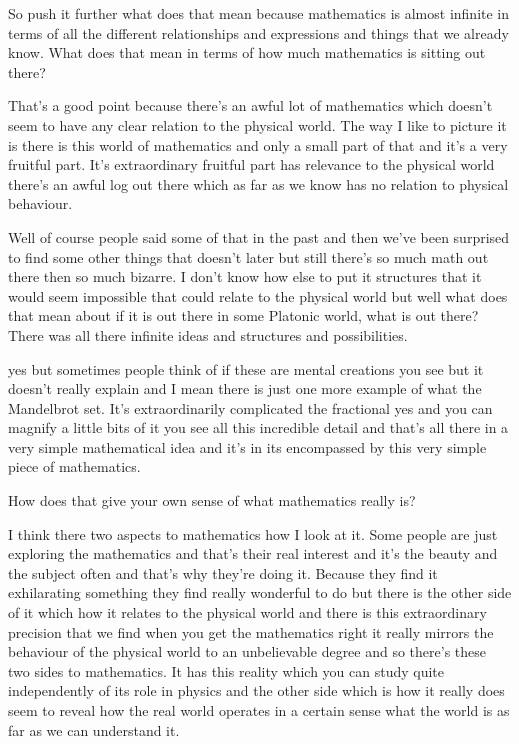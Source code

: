 \documentclass{article}
\begin{document}
So push it further what does that mean because mathematics is almost infinite in terms of all the different relationships and expressions and things that we already know. What does that mean in terms of how much mathematics is sitting out there?

That's a good point because there's an awful lot of mathematics which doesn't seem to have any clear relation to the physical world. The way I like to picture it is there is this world of mathematics and only a small part of that and it's a very fruitful part. It's extraordinary fruitful part has relevance to the physical world there's an awful log out there which as far as we know has no relation to physical behaviour.

Well of course people said some of that in the past and then we've been surprised to find some other things that doesn't later but still there's so much math out there then so much bizarre. I don't know how else to put it structures that it would seem impossible that could relate to the physical world but well what does that mean about if it is out there in some Platonic world, what is out there? There was all there infinite ideas and structures and possibilities.

yes but sometimes people think of if these are mental creations you see but it doesn't really explain and I mean there is just one more example of what the Mandelbrot set. It's extraordinarily complicated the fractional yes and you can magnify a little bits of it you see all this incredible detail and that's all there in a very simple mathematical idea and it's in its encompassed by this very simple piece of mathematics.

How does that give your own sense of what mathematics really is?

I think there two aspects to mathematics how I look at it. Some people are just exploring the mathematics and that's their real interest and it's the beauty and the subject often and that's why they're doing it. Because they find it exhilarating something they find really wonderful to do but there is the other side of it which how it relates to the physical world and there is this extraordinary precision that we find when you get the mathematics right it really mirrors the behaviour of the physical world to an unbelievable degree and so there's these two sides to mathematics. It has this reality which you can study quite independently of its role in physics and the other side which is how it really does seem to reveal how the real world operates in a certain sense what the world is as far as we can understand it.
\end{document}
